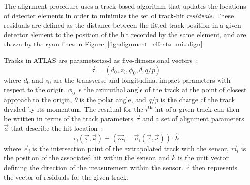 The alignment procedure uses a track-based algorithm that updates the locations of detector elements in order to minimize the set of track-hit \emph{residuals}.
These residuals are defined as the distance between the fitted track position in a given detector element to the position of the hit recorded by the same element, and are shown by the cyan lines in Figure~\ref{fig:alignment_effects_misalign}.

Tracks in ATLAS are parameterized as five-dimensional vectors~\cite{2006.atlas-tracking-model}:%
\begin{equation}
  \vec{\tau} = (d_0,z_0,\phi_0,\theta,q/p)
\end{equation}
where $d_0$ and $z_0$ are the transverse and longitudinal impact parameters with respect to the origin, $\phi_0$ is the azimuthal angle of the track at the point of closest approach to the origin, $\theta$ is the polar angle, and $q/p$ is the charge of the track divided by its momentum.
The residual for the $i^{\textrm{th}}$ hit of a given track can then be written in terms of the track parameters $\vec{\tau}$ and a set of alignment parameters $\vec{a}$ that describe the hit location~\cite{2005.global-chi2-alignment}:
\begin{equation}
  r_i(\vec{\tau},\vec{a}) = (\vec{m}_i - \vec{e}_i (\vec{\tau},\vec{a}))\cdot\hat{k}
\end{equation}
where $\vec{e}_i$ is the intersection point of the extrapolated track with the sensor, $\vec{m}_i$ is the position of the associated hit within the sensor, and $\hat{k}$ is the unit vector defining the direction of the measurement within the sensor.
$\vec{r}$ then represents the vector of residuals for the given track.

